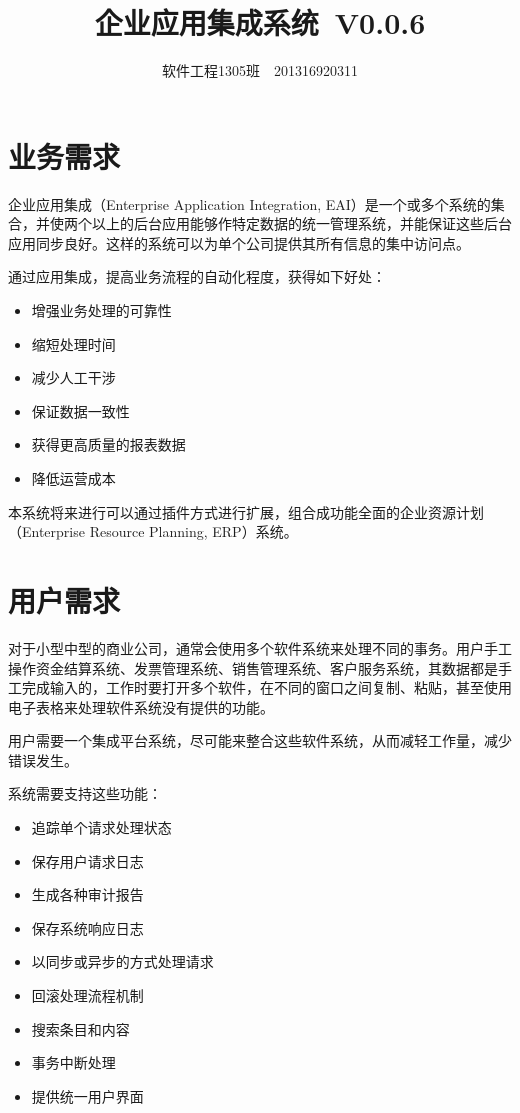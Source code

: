 \documentclass[cs4size,a4paper,nofonts]{ctexart}
\def\tjf{{\tt{田劲锋}}}
\def\titlec{企业应用集成系统}
\def\version{V0.0.6}
\begin{document}

\title{\bf\titlec~\version}
\author{软件工程1305班~\quad\tjf\quad~201316920311}
\maketitle

\section{业务需求}

企业应用集成（Enterprise Application Integration, EAI）是一个或多个系统的集合，并使两个以上的后台应用能够作特定数据的统一管理系统，并能保证这些后台应用同步良好。这样的系统可以为单个公司提供其所有信息的集中访问点。

通过应用集成，提高业务流程的自动化程度，获得如下好处：

\begin{itemize}
\item 增强业务处理的可靠性
\item 缩短处理时间
\item 减少人工干涉
\item 保证数据一致性
\item 获得更高质量的报表数据
\item 降低运营成本
\end{itemize}

本系统将来进行可以通过插件方式进行扩展，组合成功能全面的企业资源计划（Enterprise Resource Planning, ERP）系统。

\section{用户需求}

对于小型中型的商业公司，通常会使用多个软件系统来处理不同的事务。用户手工操作资金结算系统、发票管理系统、销售管理系统、客户服务系统，其数据都是手工完成输入的，工作时要打开多个软件，在不同的窗口之间复制、粘贴，甚至使用电子表格来处理软件系统没有提供的功能。

用户需要一个集成平台系统，尽可能来整合这些软件系统，从而减轻工作量，减少错误发生。

系统需要支持这些功能：

\begin{itemize}
\item 追踪单个请求处理状态
\item 保存用户请求日志
\item 生成各种审计报告
\item 保存系统响应日志
\item 以同步或异步的方式处理请求
\item 回滚处理流程机制
\item 搜索条目和内容
\item 事务中断处理
\item 提供统一用户界面
\end{itemize}
\end{document}
